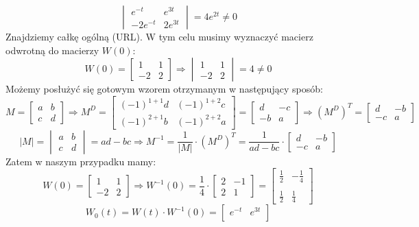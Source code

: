 \begin{przyk}
$$\begin{vmatrix}
e^{-t} & e^{3t}\\
-2e^{-t} & 2e^{3t}
\end{vmatrix}=4e^{2t}\neq 0$$
Znajdziemy całkę ogólną (URL). W tym celu musimy wyznaczyć macierz odwrotną do macierzy $W(0)$:$$W(0)=
\begin{bmatrix}
1 & 1\\
-2 & 2
\end{bmatrix}\Rightarrow
\begin{vmatrix}
1 & 1\\
-2 & 2
\end{vmatrix}=4\neq 0$$
Możemy posłużyć się gotowym wzorem otrzymanym w następujący sposób:$$M=
\begin{bmatrix}
a & b\\
c & d
\end{bmatrix}\Rightarrow M^D=
\begin{bmatrix}
(-1)^{1+1}d & (-1)^{1+2}c\\
(-1)^{2+1}b & (-1)^{2+2}a
\end{bmatrix}=
\begin{bmatrix}
d & -c\\
-b & a
\end{bmatrix}\Rightarrow (M^D)^T=
\begin{bmatrix}
d & -b\\
-c & a
\end{bmatrix}$$
$$|M|=
\begin{vmatrix}
a & b\\
c & d
\end{vmatrix}=ad-bc\Rightarrow
M^{-1}=\dfrac{1}{|M|}\cdot (M^D)^T=\dfrac{1}{ad-bc}\cdot
\begin{bmatrix}
d & -b\\
-c & a
\end{bmatrix}$$
Zatem w naszym przypadku mamy:$$W(0)=
\begin{bmatrix}
1 & 1\\
-2 & 2
\end{bmatrix}\Rightarrow W^{-1}(0)=\dfrac{1}{4}\cdot
\begin{bmatrix}
2 & -1\\
2 & 1
\end{bmatrix}=
\begin{bmatrix}
\frac{1}{2} & -\frac{1}{4}\\
\\
\frac{1}{2} & \frac{1}{4}
\end{bmatrix}$$
$$W_0(t)=W(t)\cdot W^{-1}(0)=
\begin{bmatrix}
e^{-t} & e^{3t}\\

\end{bmatrix}$$
\end{przyk}
